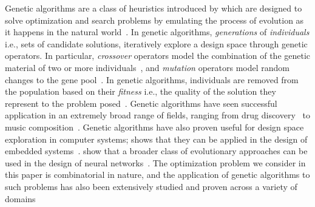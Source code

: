 \label{sec:backgroun:genetic}

Genetic algorithms are a class of heuristics introduced by \citeauthor{holland1992adaptation} which are designed to solve optimization and search problems by emulating the process of evolution as it happens in the natural world~\cite{holland1992adaptation}. In genetic algorithms, \emph{generations} of \emph{individuals} i.e., sets of candidate solutions, iteratively explore a design space through genetic operators. In particular, \emph{crossover} operators model the combination of the genetic material of two or more individuals~\cite{10.1145/3009966}, and \emph{mutation} operators model random changes to the gene pool~\cite{294849}. In genetic algorithms, individuals are removed from the population based on their \emph{fitness} i.e., the quality of the solution they represent to the problem posed~\cite{Sivanandam2008}. Genetic algorithms have seen successful application in an extremely broad range of fields, ranging from drug discovery~\cite{TERFLOTH2001102} to music composition~\cite{doi:10.1080/0749446032000150870}. Genetic algorithms have also proven useful for design space exploration in computer systems; \citeauthor{7738470} shows that they can be applied in the design of embedded systems~\cite{7738470}. \citeauthor{10.1007/978-3-030-55789-8_61} show that a broader class of evolutionary approaches can be used in the design of neural networks~\cite{10.1007/978-3-030-55789-8_61}. The optimization problem we consider in this paper is combinatorial in nature, and the application of genetic algorithms to such problems has also been extensively studied and proven across a variety of domains~\cite{doi:10.1287/ijoc.6.2.161,10.1007/3-540-55027-5_23,hegerty2009comparative,Goncalves2011}
